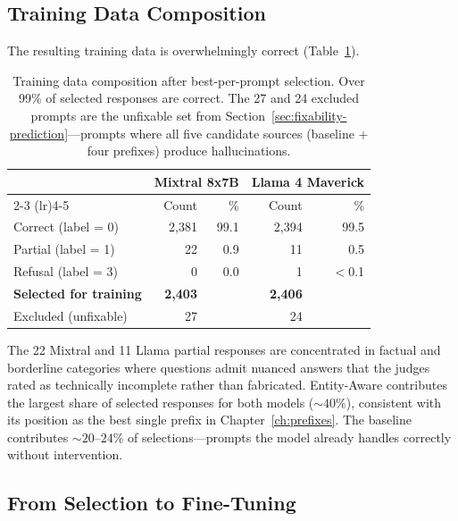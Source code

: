 \subsection{Training Data Composition}
\label{sec:training-composition}

The resulting training data is overwhelmingly correct (Table~\ref{tab:training-composition}).

\begin{table}[ht]
\centering
\small
\begin{tabular}{@{}lrrrr@{}}
\toprule
& \multicolumn{2}{c}{\textbf{Mixtral 8x7B}} & \multicolumn{2}{c}{\textbf{Llama 4 Maverick}} \\
\cmidrule(lr){2-3} \cmidrule(lr){4-5}
& Count & \% & Count & \% \\
\midrule
Correct (label = 0) & 2{,}381 & 99.1 & 2{,}394 & 99.5 \\
Partial (label = 1) & 22 & 0.9 & 11 & 0.5 \\
Refusal (label = 3) & 0 & 0.0 & 1 & $<$0.1 \\
\midrule
\textbf{Selected for training} & \textbf{2{,}403} & & \textbf{2{,}406} & \\
Excluded (unfixable) & 27 & & 24 & \\
\bottomrule
\end{tabular}
\caption{Training data composition after best-per-prompt selection. Over 99\% of selected responses are correct. The 27 and 24 excluded prompts are the unfixable set from Section~\ref{sec:fixability-prediction}---prompts where all five candidate sources (baseline + four prefixes) produce hallucinations.}
\label{tab:training-composition}
\end{table}

The 22 Mixtral and 11 Llama partial responses are concentrated in factual and borderline categories where questions admit nuanced answers that the judges rated as technically incomplete rather than fabricated. Entity-Aware contributes the largest share of selected responses for both models (${\sim}40\%$), consistent with its position as the best single prefix in Chapter~\ref{ch:prefixes}. The baseline contributes ${\sim}20$--$24\%$ of selections---prompts the model already handles correctly without intervention.

\subsection{From Selection to Fine-Tuning}
\label{sec:selection-to-ft}


